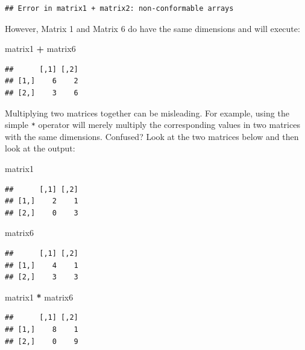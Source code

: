 \documentclass[
]{book}
\newenvironment{Shaded}{\begin{snugshade}}{\end{snugshade}}
\newcommand{\NormalTok}[1]{#1}
\newcommand{\OperatorTok}[1]{\textcolor[rgb]{0.81,0.36,0.00}{\textbf{#1}}}
\newcommand{\StringTok}[1]{\textcolor[rgb]{0.31,0.60,0.02}{#1}}
\begin{document}
\begin{verbatim}
## Error in matrix1 + matrix2: non-conformable arrays
\end{verbatim}

However, Matrix 1 and Matrix 6 do have the same dimensions and will execute:

\begin{Shaded}
\begin{Highlighting}[]
\NormalTok{matrix1 }\OperatorTok{+}\StringTok{ }\NormalTok{matrix6}
\end{Highlighting}
\end{Shaded}

\begin{verbatim}
##      [,1] [,2]
## [1,]    6    2
## [2,]    3    6
\end{verbatim}

Multiplying two matrices together can be misleading. For example, using the simple \texttt{*} operator will merely multiply the corresponding values in two matrices with the same dimensions. Confused? Look at the two matrices below and then look at the output:

\begin{Shaded}
\begin{Highlighting}[]
\NormalTok{matrix1}
\end{Highlighting}
\end{Shaded}

\begin{verbatim}
##      [,1] [,2]
## [1,]    2    1
## [2,]    0    3
\end{verbatim}

\begin{Shaded}
\begin{Highlighting}[]
\NormalTok{matrix6}
\end{Highlighting}
\end{Shaded}

\begin{verbatim}
##      [,1] [,2]
## [1,]    4    1
## [2,]    3    3
\end{verbatim}

\begin{Shaded}
\begin{Highlighting}[]
\NormalTok{matrix1 }\OperatorTok{*}\StringTok{ }\NormalTok{matrix6}
\end{Highlighting}
\end{Shaded}

\begin{verbatim}
##      [,1] [,2]
## [1,]    8    1
## [2,]    0    9
\end{verbatim}
\end{document}
